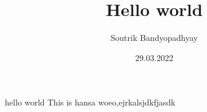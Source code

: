 \documentclass[12pt, letterpaper, twoside]{article}
\title{Hello world}
\author{Soutrik Bandyopadhyay}
\date{29.03.2022}
\begin{document}
\begin{maketitle}
\maketitle
	\cite{bhasin2013Automatica}
\end{maketitle}

hello world
 This is hansa
 woeo,ejrkalsjdkfjasdk
\end{document}
